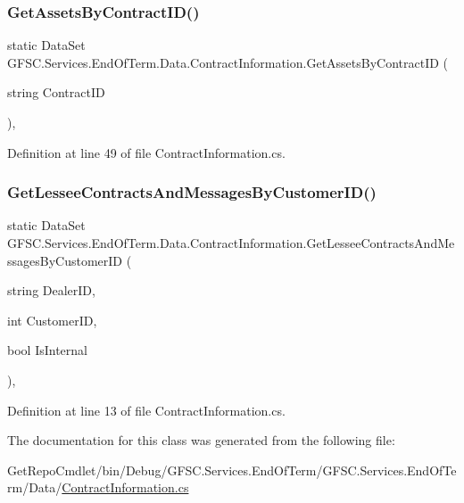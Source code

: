 \subsubsection{\texorpdfstring{Get\+Assets\+By\+Contract\+I\+D()}{GetAssetsByContractID()}}
{\footnotesize\ttfamily static Data\+Set G\+F\+S\+C.\+Services.\+End\+Of\+Term.\+Data.\+Contract\+Information.\+Get\+Assets\+By\+Contract\+ID (\begin{DoxyParamCaption}\item[{string}]{Contract\+ID }\end{DoxyParamCaption})\hspace{0.3cm}{\ttfamily [static]}, {\ttfamily [package]}}



Definition at line 49 of file Contract\+Information.\+cs.

\mbox{\label{class_g_f_s_c_1_1_services_1_1_end_of_term_1_1_data_1_1_contract_information_a3c53201f4ff038c8dad549e60f808fac}} 
\subsubsection{\texorpdfstring{Get\+Lessee\+Contracts\+And\+Messages\+By\+Customer\+I\+D()}{GetLesseeContractsAndMessagesByCustomerID()}}
{\footnotesize\ttfamily static Data\+Set G\+F\+S\+C.\+Services.\+End\+Of\+Term.\+Data.\+Contract\+Information.\+Get\+Lessee\+Contracts\+And\+Messages\+By\+Customer\+ID (\begin{DoxyParamCaption}\item[{string}]{Dealer\+ID,  }\item[{int}]{Customer\+ID,  }\item[{bool}]{Is\+Internal }\end{DoxyParamCaption})\hspace{0.3cm}{\ttfamily [static]}, {\ttfamily [package]}}



Definition at line 13 of file Contract\+Information.\+cs.



The documentation for this class was generated from the following file\+:\begin{DoxyCompactItemize}
\item 
Get\+Repo\+Cmdlet/bin/\+Debug/\+G\+F\+S\+C.\+Services.\+End\+Of\+Term/\+G\+F\+S\+C.\+Services.\+End\+Of\+Term/\+Data/\mbox{\hyperlink{_data_2_contract_information_8cs}{Contract\+Information.\+cs}}\end{DoxyCompactItemize}
